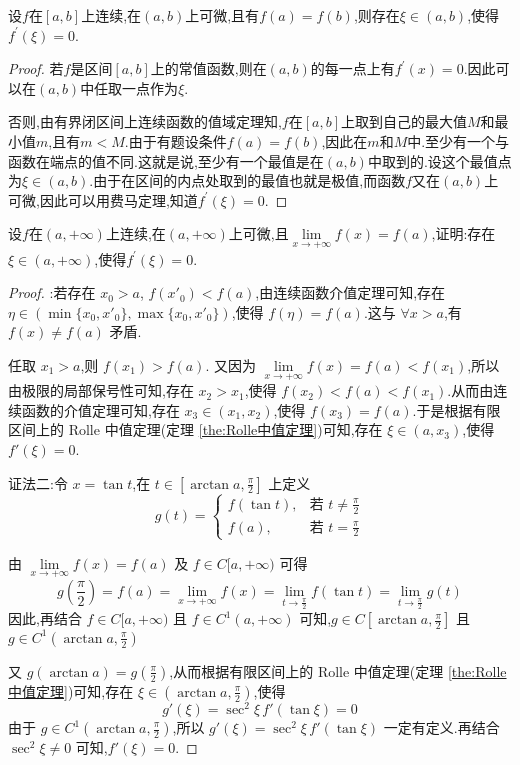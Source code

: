 \documentclass[lang=cn,newtx,10pt,scheme=chinese]{elegantbook}
\begin{document}
\begin{theorem}\label{the:Rolle中值定理}
    设$f$在$[a,b]$上连续,在$(a,b)$上可微,且有$f(a)=f(b)$,则存在$\xi\in(a,b)$,使得$f^{\prime}(\xi)=0$.
\end{theorem}
\begin{proof}
    若$f$是区间$[a,b]$上的常值函数,则在$(a,b)$的每一点上有$f^{\prime}(x)=0$.因此可以在$(a,b)$中任取一点作为$\xi$.
    
    否则,由有界闭区间上连续函数的值域定理知,$f$在$[a,b]$上取到自己的最大值$M$和最小值$m$,且有$m< M$.由于有题设条件$f(a)=f(b)$,因此在$m$和$M$中.至少有一个与函数在端点的值不同.这就是说,至少有一个最值是在$(a,b)$中取到的.设这个最值点为$\xi\in(a,b)$.由于在区间的内点处取到的最值也就是极值,而函数$f$又在$(a,b)$上可微,因此可以用费马定理,知道$f^{\prime}(\xi)=0$.
\end{proof}

\begin{theorem}\label{the:Rolle中值定理在无限区间上的推广}
    设$f$在$(a,+\infty)$上连续,在$(a,+\infty)$上可微,且$\lim\limits_{x\rightarrow +\infty}f(x)=f(a)$,证明:存在$\xi\in(a,+\infty)$,使得$f^{\prime}(\xi)=0$.
\end{theorem}

\begin{proof}
    {\color{blue} }:若存在 $x_0 > a$, $f(x'_0) < f(a)$,由连续函数介值定理可知,存在 $\eta \in (\min\{x_0, x'_0\}, \max\{x_0, x'_0\})$,使得 $f(\eta) = f(a)$.这与 $\forall x > a$,有 $f(x) \neq f(a)$ 矛盾.

    任取 $x_1 > a$,则 $f(x_1) > f(a)$.
    又因为 $\lim\limits_{x \to +\infty} f(x) = f(a) < f(x_1)$,所以由极限的局部保号性可知,存在 $x_2 > x_1$,使得 $f(x_2) < f(a) < f(x_1)$.从而由连续函数的介值定理可知,存在 $x_3 \in (x_1, x_2)$,使得 $f(x_3) = f(a)$.于是根据有限区间上的 Rolle 中值定理(定理 \ref{the:Rolle中值定理})可知,存在 $\xi \in (a, x_3)$,使得 $f'(\xi) = 0$.

    证法二:令 $x = \tan t$,在 $t \in [\arctan a, \frac{\pi}{2}]$ 上定义
    \[
    g(t) =
    \begin{cases}
        f(\tan t), & \text{若 } t \neq \frac{\pi}{2} \\
        f(a), & \text{若 } t = \frac{\pi}{2}
    \end{cases}
    \]
    
    由 $\lim\limits_{x \to +\infty} f(x) = f(a)$ 及 $f \in C[a, +\infty)$ 可得
    \[
    g\left( \frac{\pi}{2} \right) = f(a) = \lim_{x \to +\infty} f(x) = \lim_{t \to \frac{\pi}{2}} f(\tan t) = \lim_{t \to \frac{\pi}{2}} g(t)
    \]
    因此,再结合 $f \in C[a, +\infty)$ 且 $f \in C^1(a, +\infty)$ 可知,$g \in C[\arctan a, \frac{\pi}{2}]$ 且 $g \in C^1(\arctan a, \frac{\pi}{2})$

    又 $g(\arctan a) = g\left( \frac{\pi}{2} \right)$,从而根据有限区间上的 Rolle 中值定理(定理 \ref{the:Rolle中值定理})可知,存在 $\xi \in (\arctan a, \frac{\pi}{2})$,使得
    \[
    g'(\xi) = \sec^2 \xi \, f'(\tan \xi) = 0
    \]
    由于 $g \in C^1(\arctan a, \frac{\pi}{2})$,所以 $g'(\xi) = \sec^2 \xi \, f'(\tan \xi)$ 一定有定义.再结合 $\sec^2 \xi \neq 0$ 可知,$f'(\xi) = 0$.
\end{proof}
\end{document}
